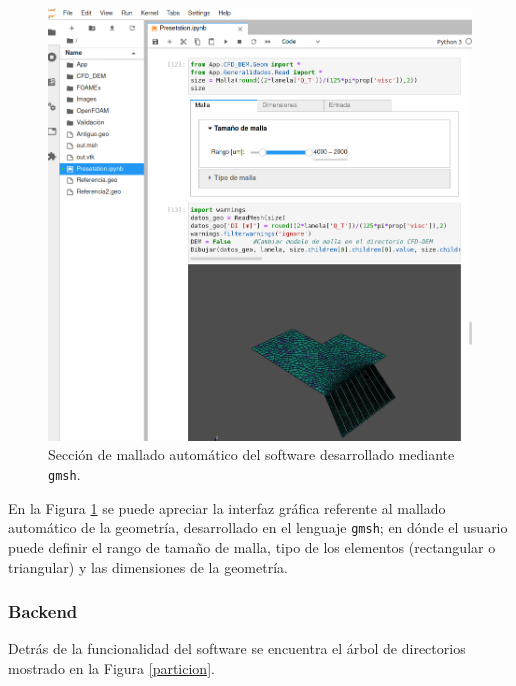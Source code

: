 \begin{figure}[h!]
	\centering
	\includegraphics[width=\textwidth]{Images/interfaz2.png}
	\caption{Secci\'on de mallado autom\'atico del software desarrollado mediante \texttt{gmsh}.}
	\label{mallado:gmsh}
\end{figure}

\noindent
\justify

En la Figura \ref{mallado:gmsh} se puede apreciar la interfaz gr\'afica referente al mallado autom\'atico de la geometr\'ia, desarrollado en el lenguaje \texttt{gmsh}; en d\'onde el usuario puede definir el rango de tama\~no de malla, tipo de los elementos (rectangular o triangular) y las dimensiones de la geometr\'ia.

\newpage

\subsubsection{Backend}

\noindent
\justify

Detr\'as de la funcionalidad del software se encuentra el \'arbol de directorios mostrado en la Figura \ref{particion}.



\newpage

